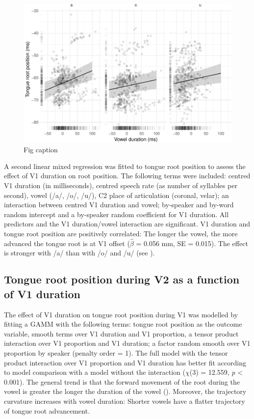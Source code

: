 \documentclass[12pt,]{article}
\begin{document}
\label{s:trp-vdur}

\begin{figure}
\includegraphics[width=\linewidth]{2018-tra_files/figure-latex/tra-lm-2-plot-1} \caption{Fig caption}\label{f:tra-lm-2-plot}
\end{figure}

A second linear mixed regression was fitted to tongue root position to
assess the effect of V1 duration on root position. The following terms
were included: centred V1 duration (in milliseconds), centred speech
rate (as number of syllables per second), vowel (/a/, /o/, /u/), C2
place of articulation (coronal, velar); an interaction between centred
V1 duration and vowel; by-speaker and by-word random intercept and a
by-speaker random coefficient for V1 duration. All predictors and the V1
duration/vowel interaction are significant. V1 duration and tongue root
position are positively correlated: The longer the vowel, the more
advanced the tongue root is at V1 offset (\(\hat{\beta}\) = 0.056 mm, SE
= 0.015). The effect is stronger with /a/ than with /o/ and /u/ (see
).

\subsection{Tongue root position during V2 as a function of V1
duration}\label{tongue-root-position-during-v2-as-a-function-of-v1-duration}

The effect of V1 duration on tongue root position during V1 was modelled
by fitting a GAMM with the following terms: tongue root position as the
outcome variable, smooth terms over V1 duration and V1 proportion, a
tensor product interaction over V1 proportion and V1 duration; a factor
random smooth over V1 proportion by speaker (penalty order = 1). The
full model with the tensor product interaction over V1 proportion and V1
duration has better fit according to model comparison with a model
without the interaction (\(\chi\)(3) = 12.559, \emph{p} \textless{}
0.001). The general trend is that the forward movement of the root
during the vowel is greater the longer the duration of the vowel
(). Moreover, the trajectory curvature increases
with vowel duration: Shorter vowels have a flatter trajectory of tongue
root advancement.
\end{document}
